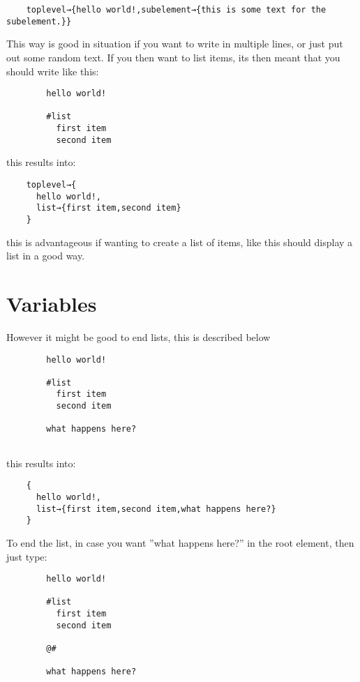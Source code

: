\documentclass{book}
\begin{document}
	\begin{verbatim}
	toplevel→{hello world!,subelement→{this is some text for the subelement.}}
	\end{verbatim}
	
	This way is good in situation if you want to write in multiple lines, or just put out some random text.
	If you then want to list items, its then meant that you should write like this:
	
	\begin{verbatim}
		hello world!
		
		#list
		  first item
		  second item
	\end{verbatim}
	
	this results into:
	
	\begin{verbatim}
	toplevel→{
	  hello world!,
	  list→{first item,second item}
	}
	\end{verbatim}
	
	this is advantageous if wanting to create a list of items, like this should display a list in a good way.
	
	\section{Variables}
	
	However it might be good to end lists, this is described below
	
	\begin{verbatim}
		hello world!
		
		#list
		  first item
		  second item
			
		what happens here?
		
	\end{verbatim}
	
	this results into:
	
	\begin{verbatim}
	{
	  hello world!,
	  list→{first item,second item,what happens here?}
	}
	\end{verbatim}
	
	To end the list, in case you want ''what happens here?'' in the root element, then just type:
	
	\begin{verbatim}
		hello world!
		
		#list
		  first item
		  second item
		
		@#
		
		what happens here?
		
	\end{verbatim}
	
\end{document}
